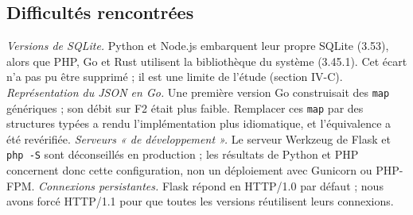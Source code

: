 \subsection{Difficultés rencontrées}
\emph{Versions de SQLite.} Python et Node.js embarquent leur propre SQLite (3.53), alors que PHP, Go et Rust utilisent
la bibliothèque du système (3.45.1). Cet écart n'a pas pu être supprimé ; il est une limite de l'étude (section IV-C).
\emph{Représentation du JSON en Go.} Une première version Go construisait des \texttt{map} génériques ; son débit
sur F2 était plus faible. Remplacer ces \texttt{map} par des structures typées a rendu l'implémentation plus
idiomatique, et l'équivalence a été revérifiée.
\emph{Serveurs « de développement ».} Le serveur Werkzeug de Flask et \texttt{php -S} sont déconseillés en production ;
les résultats de Python et PHP concernent donc cette configuration, non un déploiement avec Gunicorn ou
PHP-FPM.
\emph{Connexions persistantes.} Flask répond en HTTP/1.0 par défaut ; nous avons forcé HTTP/1.1 pour que toutes les
versions réutilisent leurs connexions.
